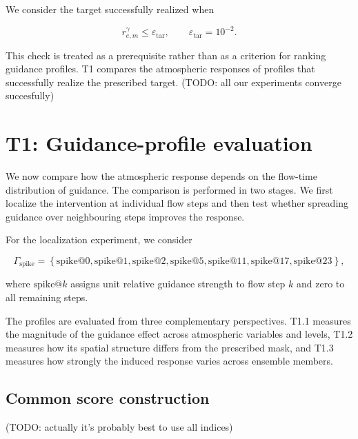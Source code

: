 We consider the target successfully realized when

\begin{equation}
    r_{e,m}^{\gamma}
    \leq
    \varepsilon_{\mathrm{tar}},
    \qquad
    \varepsilon_{\mathrm{tar}}=10^{-2}.
    \label{eq:target-realization-tolerance}
\end{equation}

This check is treated as a prerequisite rather than as a criterion for ranking
guidance profiles. T1 compares the atmospheric responses of profiles that
successfully realize the prescribed target.
(TODO: all our experiments converge succesfully)

\section{T1: Guidance-profile evaluation}
\label{sec:guidance-profile-evaluation}

We now compare how the atmospheric response depends on the flow-time
distribution of guidance. The comparison is performed in two stages. We first
localize the intervention at individual flow steps and then test whether
spreading guidance over neighbouring steps improves the response.

For the localization experiment, we consider

\begin{equation}
    \Gamma_{\mathrm{spike}}
    =
    \left\{
        \mathrm{spike@0},
        \mathrm{spike@1},
        \mathrm{spike@2},
        \mathrm{spike@5},
        \mathrm{spike@11},
        \mathrm{spike@17},
        \mathrm{spike@23}
    \right\},
    \label{eq:spike-profile-set}
\end{equation}

where $\mathrm{spike@}k$ assigns unit relative guidance strength to flow step
$k$ and zero to all remaining steps.

The profiles are evaluated from three complementary perspectives. T1.1
measures the magnitude of the guidance effect across atmospheric variables and
levels, T1.2 measures how its spatial structure differs from the prescribed
mask, and T1.3 measures how strongly the induced response varies across
ensemble members.


\subsection{Common score construction}
\label{sec:t1-common-score}

(TODO: actually it's probably best to use all indices)

